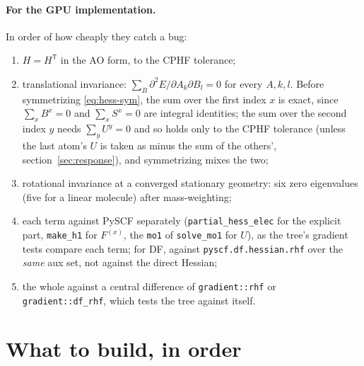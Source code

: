 \documentclass[11pt]{article}
\newcommand{\code}[1]{\texttt{#1}}
\newcommand{\Fsk}[1]{F^{(#1)}}
\begin{document}
\paragraph{For the GPU implementation.} In order of how cheaply they catch
a bug:
\begin{enumerate}
  \item $H = H^{\mathsf T}$ in the AO form, to the CPHF tolerance;
  \item translational invariance: $\sum_B \partial^2E/\partial A_k\partial
        B_l = 0$ for every $A, k, l$. Before symmetrizing
        \eqref{eq:hess-sym}, the sum over the first index $x$ is exact, since
        $\sum_x B^x = 0$ and $\sum_x S^x = 0$ are integral identities; the
        sum over the second index $y$ needs $\sum_y U^y = 0$ and so holds
        only to the CPHF tolerance (unless the last atom's $U$ is taken as
        minus the sum of the others', section~\ref{sec:response}), and
        symmetrizing mixes the two;
  \item rotational invariance at a converged stationary geometry: six
        zero eigenvalues (five for a linear molecule) after mass-weighting;
  \item each term against PySCF separately (\code{partial\_hess\_elec}
        for the explicit part, \code{make\_h1} for $\Fsk{x}$, the
        \code{mo1} of \code{solve\_mo1} for $U$), as the tree's gradient
        tests compare each term; for DF, against \code{pyscf.df.hessian.rhf}
        over the \emph{same} aux set, not against the direct Hessian;
  \item the whole against a central difference of \code{gradient::rhf}
        or \code{gradient::df\_rhf}, which tests the tree against itself.
\end{enumerate}

\section{What to build, in order}
\label{sec:rhf-plan}
\end{document}
